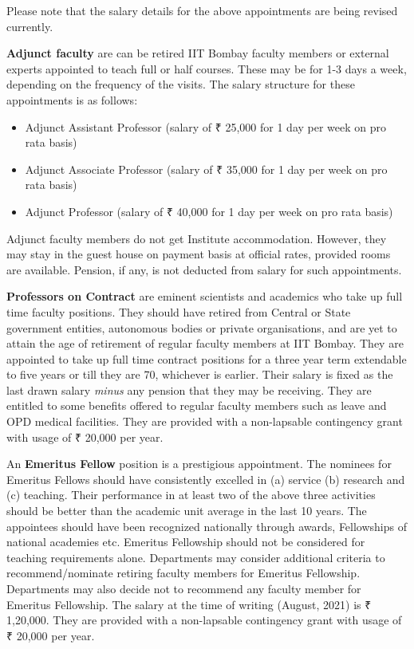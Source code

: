 \documentclass[
  10pt,
  a5paper,
  10pt,
  openany]{amsbook}
\providecommand{\tightlist}{%
  \setlength{\itemsep}{0pt}\setlength{\parskip}{0pt}}
\begin{document}
Please note that the salary details for the above appointments are being
revised currently.

\textbf{Adjunct faculty} are can be retired IIT Bombay faculty members
or external experts appointed to teach full or half courses. These may
be for 1-3 days a week, depending on the frequency of the visits. The
salary structure for these appointments is as follows:

\begin{itemize}
\tightlist
\item
  Adjunct Assistant Professor (salary of ₹ 25,000 for 1 day per week on
  pro rata basis)
\item
  Adjunct Associate Professor (salary of ₹ 35,000 for 1 day per week on
  pro rata basis)
\item
  Adjunct Professor (salary of ₹ 40,000 for 1 day per week on pro rata
  basis)
\end{itemize}

Adjunct faculty members do not get Institute accommodation. However,
they may stay in the guest house on payment basis at official rates,
provided rooms are available. Pension, if any, is not deducted from
salary for such appointments.

\textbf{Professors on Contract} are eminent scientists and academics who
take up full time faculty positions. They should have retired from
Central or State government entities, autonomous bodies or private
organisations, and are yet to attain the age of retirement of regular
faculty members at IIT Bombay. They are appointed to take up full time
contract positions for a three year term extendable to five years or
till they are 70, whichever is earlier. Their salary is fixed as the
last drawn salary \emph{minus} any pension that they may be receiving.
They are entitled to some benefits offered to regular faculty members
such as leave and OPD medical facilities. They are provided with a
non-lapsable contingency grant with usage of ₹ 20,000 per year.

An \textbf{Emeritus Fellow} position is a prestigious appointment. The
nominees for Emeritus Fellows should have consistently excelled in (a)
service (b) research and (c) teaching. Their performance in at least two
of the above three activities should be better than the academic unit
average in the last 10 years. The appointees should have been recognized
nationally through awards, Fellowships of national academies etc.
Emeritus Fellowship should not be considered for teaching requirements
alone. Departments may consider additional criteria to
recommend/nominate retiring faculty members for Emeritus Fellowship.
Departments may also decide not to recommend any faculty member for
Emeritus Fellowship. The salary at the time of writing (August, 2021) is
₹ 1,20,000. They are provided with a non-lapsable contingency grant with
usage of ₹ 20,000 per year.
\end{document}
